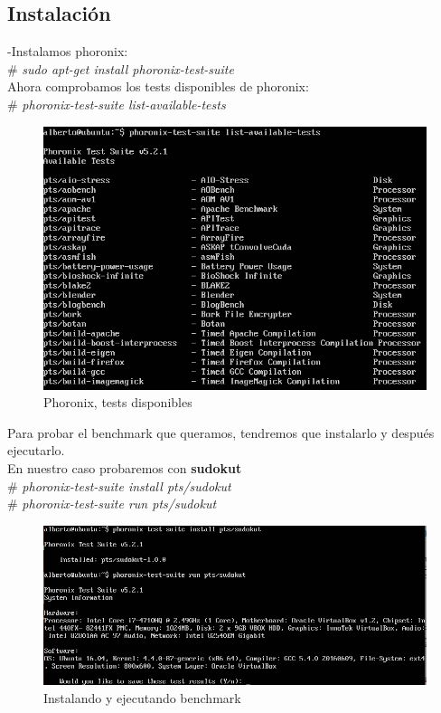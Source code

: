\subsection{Instalación}
-Instalamos phoronix: \\
\# \textit{sudo apt-get install phoronix-test-suite} \\


Ahora comprobamos los tests disponibles de phoronix: \\
\# \textit{phoronix-test-suite list-available-tests} \\


\begin{figure}[h]
	\centering
	\includegraphics[scale=0.5]{images/available.png}
	\caption{Phoronix, tests disponibles}
\end{figure}


Para probar el benchmark que queramos, tendremos que instalarlo y después ejecutarlo. \\
\newpage
En nuestro caso probaremos con \textbf{sudokut}\\ 
\# \textit{phoronix-test-suite install pts/sudokut} \\
\# \textit{phoronix-test-suite run pts/sudokut} \\


\begin{figure}[h]
	\centering
	\includegraphics[scale=0.5]{images/install.png}
	\caption{Instalando y ejecutando benchmark}
\end{figure}


